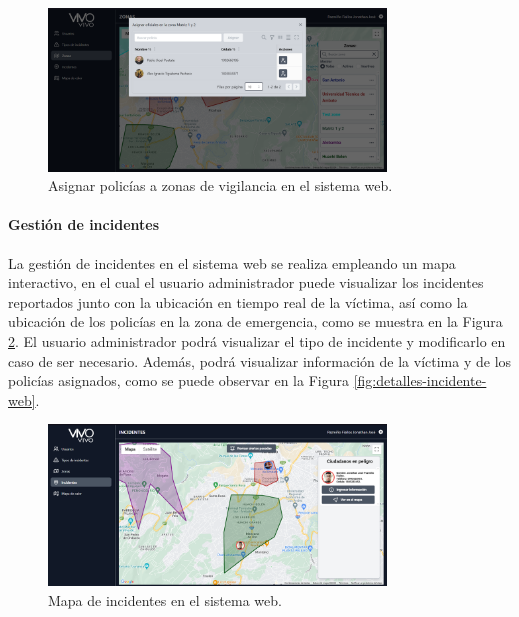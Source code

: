 \begin{figure}[H]
    \centering
    \includegraphics[width=0.8\textwidth]{chapters/III-resultados-y-discusion/resources/images/asignar-policias-zona-vigilancia-web.png}
    \caption{Asignar policías a zonas de vigilancia en el sistema web.}
    \label{fig:asignar-policias-zona-vigilancia-web}
\end{figure}

\paragraph{Gestión de incidentes}
La gestión de incidentes en el sistema web se realiza empleando un mapa interactivo, en el cual el usuario administrador puede visualizar
los incidentes reportados junto con la ubicación en tiempo real de la víctima, así como la ubicación de los policías en la zona de emergencia,
como se muestra en la Figura \ref{fig:mapa-incidentes-web}. El usuario administrador podrá visualizar el tipo de incidente y modificarlo en
caso de ser necesario. Además, podrá visualizar información de la víctima y de los policías asignados, como se puede observar en la Figura
\ref{fig:detalles-incidente-web}.

\begin{figure}[H]
    \centering
    \includegraphics[width=0.8\textwidth]{chapters/III-resultados-y-discusion/resources/images/mapa-incidentes-web.png}
    \caption{Mapa de incidentes en el sistema web.}
    \label{fig:mapa-incidentes-web}
\end{figure}

